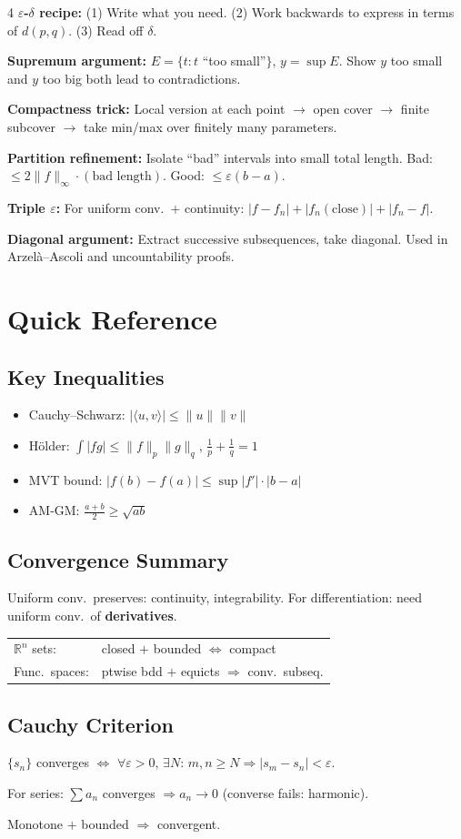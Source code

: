 \documentclass[9pt,landscape]{extarticle}
\newcommand{\R}{\mathbb{R}}
\newcommand{\eps}{\varepsilon}
\theoremstyle{compact}
\theoremstyle{defnstyle}
\begin{document}
\begin{multicols}{4}
\textbf{$\eps$-$\delta$ recipe:} (1) Write what you need. (2) Work backwards to express in terms of $d(p,q)$. (3) Read off $\delta$.

\textbf{Supremum argument:} $E = \{t : t$ ``too small''$\}$, $y = \sup E$. Show $y$ too small and $y$ too big both lead to contradictions.

\textbf{Compactness trick:} Local version at each point $\to$ open cover $\to$ finite subcover $\to$ take min/max over finitely many parameters.

\textbf{Partition refinement:} Isolate ``bad'' intervals into small total length. Bad: $\leq 2\|f\|_\infty \cdot (\text{bad length})$. Good: $\leq \eps(b-a)$.

\textbf{Triple $\eps$:} For uniform conv.\ $+$ continuity: $|f-f_n| + |f_n(\text{close})| + |f_n-f|$.

\textbf{Diagonal argument:} Extract successive subsequences, take diagonal. Used in Arzel\`a--Ascoli and uncountability proofs.

\section{Quick Reference}

\subsection{Key Inequalities}
\begin{itemize}
\item Cauchy--Schwarz: $|\langle u,v\rangle| \leq \|u\|\|v\|$
\item H\"older: $\int|fg| \leq \|f\|_p\|g\|_q$, $\frac{1}{p}+\frac{1}{q}=1$
\item MVT bound: $|f(b)-f(a)| \leq \sup|f'|\cdot|b-a|$
\item AM-GM: $\frac{a+b}{2} \geq \sqrt{ab}$
\end{itemize}

\subsection{Convergence Summary}
Uniform conv.\ preserves: continuity, integrability. For differentiation: need uniform conv.\ of \textbf{derivatives}.

\begin{tabular}{@{}ll@{}}
$\R^n$ sets: & closed $+$ bounded $\Leftrightarrow$ compact \\
Func.\ spaces: & ptwise bdd $+$ equicts $\Rightarrow$ conv.\ subseq. \\
\end{tabular}

\subsection{Cauchy Criterion}
$\{s_n\}$ converges $\Leftrightarrow$ $\forall\eps>0$, $\exists N$: $m,n\geq N \Rightarrow |s_m-s_n|<\eps$.

For series: $\sum a_n$ converges $\Rightarrow a_n \to 0$ (converse fails: harmonic).

Monotone $+$ bounded $\Rightarrow$ convergent.

\end{multicols}
\end{document}
